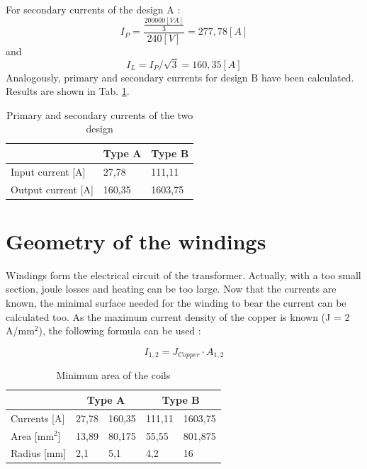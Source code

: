 \documentclass[12pt,a4paper]{report}
\begin{document}
For secondary currents of the design A :
\begin{equation}
    I_P = \frac{\frac{200000 [VA]}{3}}{240 [V]} = 277,78 [A]
\end{equation}
and 
\begin{equation}
    I_L = I_P/\sqrt{3} = 160,35[A]
\end{equation}
Analogously, primary and secondary currents for design B have been calculated. Results are shown in Tab. \ref{tab:currents}.

\begin{table}[h]
    \centering
\begin{tabular}{|l|l|l|}
  \hline
   & \textbf{Type A} &\textbf{Type B}\\
  \hline
    Input current [A] & 27,78 & 111,11\\\hline
    Output current [A] & 160,35 & 1603,75\\\hline
\end{tabular}
    \caption{Primary and secondary currents of the two design}
    \label{tab:currents}
\end{table}



\section{Geometry of the windings}
Windings form the electrical circuit of the transformer. Actually, with a too small section, joule losses and heating can be too large. Now that the currents are known, the minimal surface needed for the winding to bear the current can be calculated too. As the maximum current density of the copper is known (J = 2 A/mm$^2$), the following formula can be used :

 \begin{equation}
    I_{1,2} =  J_{Copper} \cdot A_{1,2}
\end{equation}

\begin{table}[h]
    \centering
\begin{tabular}{|l|l|l|l|l|}
  \hline
    & \multicolumn{2}{c|}{\textbf{Type A}} & \multicolumn{2}{c|}{\textbf{Type B}}\\\hline
    Currents [A] & 27,78 & 160,35 & 111,11 & 1603,75\\\hline
    Area [mm$^2$] & 13,89 & 80,175 & 55,55 & 801,875\\\hline
    Radius [mm] & 2,1 & 5,1 & 4,2 & 16\\\hline
\end{tabular}
    \caption{Minimum area of the coils}
    \label{tab:windings_area}
\end{table}
\end{document}
